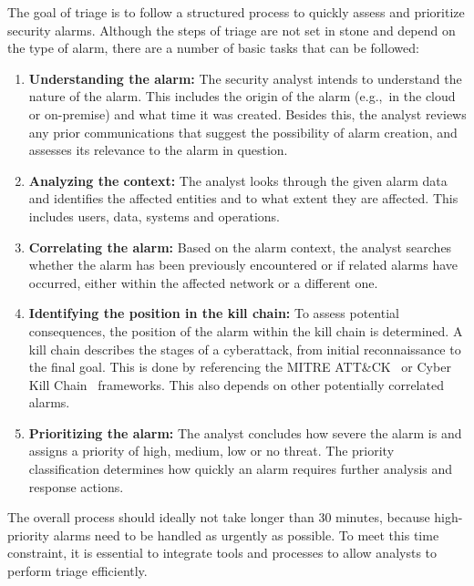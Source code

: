 The goal of triage is to follow a structured process to quickly assess and prioritize security alarms.
Although the steps of triage are not set in stone and depend on the type of alarm, there are a number of basic tasks
that can be followed:
\begin{enumerate}
    \item \textbf{Understanding the alarm:} The security analyst intends to understand the nature of the alarm.
    This includes the origin of the alarm (e.g.,\ in the cloud or on-premise) and what time it was created.
    Besides this, the analyst reviews any prior communications that suggest the possibility of alarm creation, and
    assesses its relevance to the alarm in question.

    \item \textbf{Analyzing the context:} The analyst looks through the given alarm data and identifies the affected
    entities and to what extent they are affected.
    This includes users, data, systems and operations.

    \item \textbf{Correlating the alarm:}
    Based on the alarm context, the analyst searches whether the alarm has been previously encountered or if related
    alarms have occurred, either within the affected network or a different one.

    \item \textbf{Identifying the position in the kill chain:}
    To assess potential consequences, the position of the alarm within the kill chain is determined.
    A kill chain describes the stages of a cyberattack, from initial reconnaissance to the final goal.
    This is done by referencing the MITRE ATT\&CK\ \citep{strom2018mitre} or Cyber Kill Chain\ \citep{lockheed2011ckc}
    frameworks.
    This also depends on other potentially correlated alarms.

    \item \textbf{Prioritizing the alarm:}
    The analyst concludes how severe the alarm is and assigns a priority of high, medium, low or no threat.
    The priority classification determines how quickly an alarm requires further analysis and response actions.
\end{enumerate}

The overall process should ideally not take longer than 30 minutes, because high-priority alarms need to be handled as
urgently as possible.
To meet this time constraint, it is essential to integrate tools and processes to allow analysts to perform triage
efficiently.

